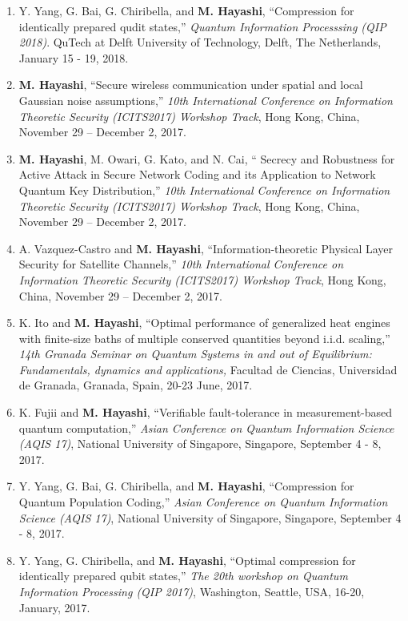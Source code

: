 \documentclass[a4paper,12pt,oneside]{article}
\begin{document}
\begin{enumerate}
\item 
Y. Yang, G. Bai, G. Chiribella, and \textbf{M. Hayashi}, 
``Compression for identically prepared qudit states,'' 
{\em Quantum Information Processsing (QIP 2018)}.
QuTech at Delft University of Technology, Delft, The Netherlands,
January 15 - 19, 2018.

\item 
\textbf{M. Hayashi},
``Secure wireless communication under spatial and local Gaussian noise assumptions,''
{\em 10th International Conference on Information Theoretic Security (ICITS2017) Workshop Track}, 
Hong Kong, China, November 29  -- December 2, 2017.


\item 
\textbf{M. Hayashi}, M. Owari, G. Kato, and N. Cai,
`` Secrecy and Robustness for Active Attack in Secure Network Coding and its Application to  Network Quantum Key Distribution,''
{\em 10th International Conference on Information Theoretic Security (ICITS2017) Workshop Track}, 
Hong Kong, China, November 29  -- December 2, 2017.


\item 
A. Vazquez-Castro and \textbf{M. Hayashi},
``Information-theoretic Physical Layer Security for Satellite Channels,''
{\em 10th International Conference on Information Theoretic Security (ICITS2017) Workshop Track}, 
Hong Kong, China, November 29  -- December 2, 2017.

\item 
K. Ito and \textbf{M. Hayashi}, 
``Optimal performance of generalized heat engines with finite-size baths of multiple conserved quantities beyond i.i.d. scaling,'' 
{\em 14th Granada Seminar on Quantum Systems
in and out of Equilibrium: Fundamentals, dynamics and applications,} 
Facultad de Ciencias, Universidad de Granada, Granada, Spain, 20-23 June, 2017.

\item 
K. Fujii and \textbf{M. Hayashi}, ``Verifiable fault-tolerance in measurement-based quantum computation,'' 
{\em Asian Conference on Quantum Information Science (AQIS 17)}, 
National University of Singapore, Singapore, September 4 - 8, 2017.

\item 
Y. Yang, G. Bai, G. Chiribella, and \textbf{M. Hayashi}, ``Compression for Quantum Population Coding,'' 
{\em Asian Conference on Quantum Information Science (AQIS 17)}, 
National University of Singapore, Singapore, September 4 - 8, 2017.

\item 
Y. Yang, G. Chiribella, and \textbf{M. Hayashi}, ``Optimal compression for identically prepared qubit states,'' 
{\em The 20th workshop on Quantum Information Processing (QIP 2017)}, 
Washington, Seattle, USA, 16-20, January, 2017.


\end{enumerate}
\end{document}
